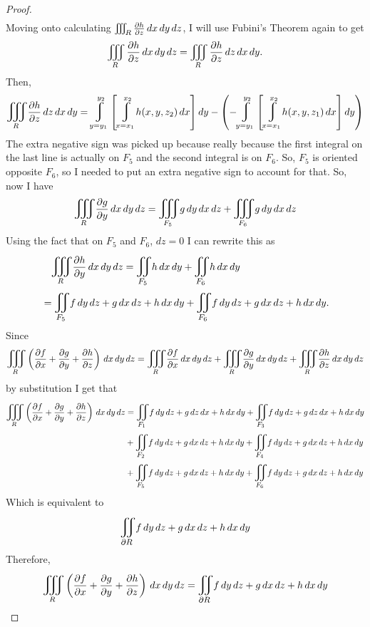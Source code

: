 \documentclass[titlepage]{article}
\begin{document}
\begin{proof}
\begin{align*}
\end{align*}
Moving onto calculating $\iiint_{R} \frac{\partial h}{\partial z} \,dx\,dy\,dz$, I will use Fubini's Theorem again to get
$$\iiint_{R} \frac{\partial h}{\partial z} \,dx\,dy\,dz = \iiint_{R} \frac{\partial h}{\partial z} \,dz\,dx\,dy.$$
Then,
$$ \mathlarger\iiint_{R}  \frac{\p h}{\p z}\,dz\,dx\,dy = \mlvarint\limits_{y=y_1}^{y_2}\left[\mlvarint\limits_{x=x_1}^{x_2} h(x,y,z_2)\,dx\right]dy - \left(- \mlvarint\limits_{y=y_1}^{y_2}\left[\mlvarint\limits_{x=x_1}^{x_2} h(x,y,z_1)\,dx\right]dy\right)$$
The extra negative sign was picked up because really because the first integral on the last line is actually on $F_5$ and the second integral is on $F_6$. So, $F_5$ is oriented opposite $F_6$, so I needed to put an extra negative sign to account for that. So, now I have
$$\mathlarger\iiint_{R}  \frac{\p g}{\p y}\,dx\,dy\,dz = \mathlarger\iiint_{F_5}  g \,dy\,dx\,dz + \mathlarger\iiint_{F_6}  g \,dy\,dx\,dz$$
Using the fact that on $F_5$ and $F_6$, $dz = 0$ I can rewrite this as 
\begin{align*}& \quad \mathlarger\iiint_{R}  \frac{\p h}{\p y}\,dx\,dy\,dz = \bigiint{F_5}{}  h \,dx\,dy + \bigiint{F_6}{}  h\,dx\,dy\\
&= \bigiint{F_5}{} f \,dy\,dz + g \,dx\,dz + h\,dx\,dy + \bigiint{F_6}{} f \,dy\,dz + g \,dx\,dz + h\,dx\,dy.
\end{align*}
Since
$$\mathlarger\iiint_{R}\left( \frac{\p f}{\p x} + \frac{\p g}{\p y} + \frac{\p h}{\p z} \right)\,dx\,dy\,dz = \mathlarger\iiint_{R}  \frac{\p f}{\p x}\,dx\,dy\,dz  + \mathlarger\iiint_{R}  \frac{\p g}{\p y}\,dx\,dy\,dz + \mathlarger\iiint_{R} \frac{\p h}{\p z} \,dx\,dy\,dz$$
by substitution I get that
\begin{align*}\mathlarger\iiint_{R}\left( \frac{\p f}{\p x} + \frac{\p g}{\p y} + \frac{\p h}{\p z} \right)\,dx\,dy\,dz &=   \bigiint{F_1}{} f\,dy\,dz + g\,dz\,dx + h\,dx\,dy +  \bigiint{F_3}{} f\,dy\,dz + g\,dz\,dx + h\,dx\,dy \\
&+\bigiint{F_2}{} f \,dy\,dz + g \,dx\,dz + h\,dx\,dy + \bigiint{F_4}{} f \,dy\,dz + g \,dx\,dz + h\,dx\,dy \\
&+ \bigiint{F_5}{} f \,dy\,dz + g \,dx\,dz + h\,dx\,dy + \bigiint{F_6}{} f \,dy\,dz + g \,dx\,dz + h\,dx\,dy
\end{align*}
Which is equivalent to
$$\bigiint{\p R}{} f \,dy\,dz + g \,dx\,dz + h\,dx\,dy$$
Therefore,
$$ \mathlarger\iiint_{R}\left( \frac{\p f}{\p x} + \frac{\p g}{\p y} + \frac{\p h}{\p z} \right)\,dx\,dy\,dz = \bigiint{\p R}{} f \,dy\,dz + g \,dx\,dz + h\,dx\,dy $$
\end{proof}
\end{document}
